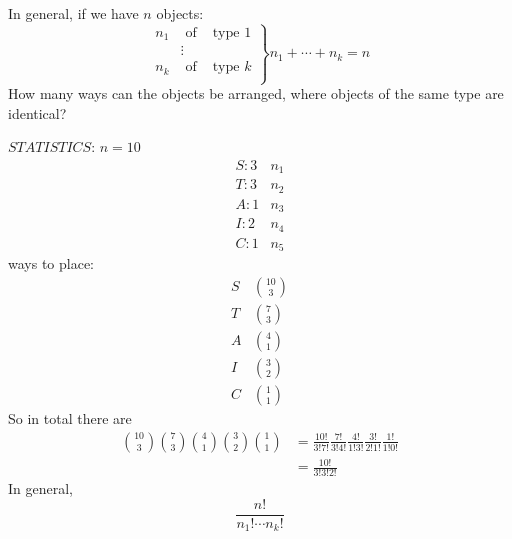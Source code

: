 In general, if we have $ n $ objects:
\[
\left.
\begin{array}{ccc}
    n_1&\text{ of } & \text{type $1$}\\
    &\vdots\\
    n_k&\text{ of } & \text{type $k$}\\
\end{array}
\right\}n_1+\cdots +n_k=n
\]
How many ways can the objects be arranged, where objects
of the same type are identical?

$STATISTICS$: $ n=10 $
\[
\begin{array}{cc}
    S:3& n_1\\
    T:3& n_2\\
    A:1& n_3\\
    I:2& n_4\\
    C:1& n_5
\end{array}
\]
ways to place:
\[
\begin{array}{cc}
    S& \binom{10}{3}\\
    T& \binom{7}{3}\\
    A& \binom{4}{1}\\
    I& \binom{3}{2}\\
    C& \binom{1}{1}
\end{array}
\]
So in total there are
\begin{align*}
    \binom{10}{3}\binom{7}{3}\binom{4}{1}\binom{3}{2}\binom{1}{1}&=
    \frac{10!}{3!7!}\frac{7!}{3!4!} \frac{4!}{1!3!} \frac{3!}{2!1!}\frac{1!}{1!0!}\\
    &=\frac{10!}{3!3!2!}  
\end{align*}
In general,
\[ \frac{n!}{n_1!\cdots n_k!} \]

